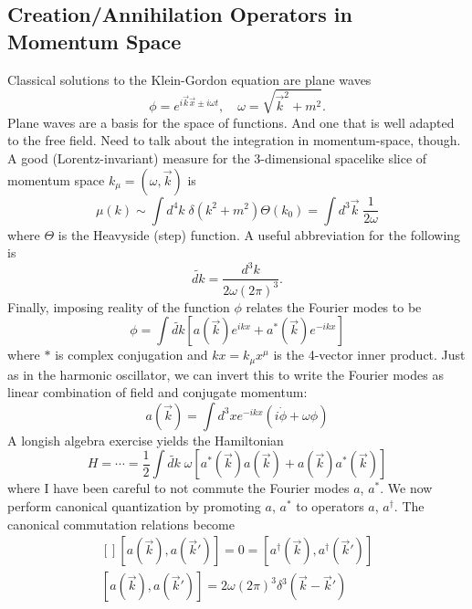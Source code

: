 \documentclass[12pt]{article}
\begin{document}
\subsection{Creation/Annihilation Operators in Momentum Space}

Classical solutions to the Klein-Gordon equation are plane waves
\begin{equation}
  \phi = e^{i\vec{k}\vec{x} \pm i\omega t}
  ,\quad
  \omega = \sqrt{\vec{k}^2 + m^2}.
\end{equation}
Plane waves are a basis for the space of functions. And one that is
well adapted to the free field. Need to talk about the integration in
momentum-space, though. A good (Lorentz-invariant) measure for the
3-dimensional spacelike slice of momentum space $k_\mu=(\omega, \vec{k})$
is
\begin{equation}
  \mu(k) \sim \int d^4k\; \delta(k^2+m^2) \Theta(k_0)
  = \int d^3\vec{k} \; \frac{1}{2\omega}
\end{equation}
where $\Theta$ is the Heavyside (step) function. A useful abbreviation
for the following is 
\begin{equation}
  \widetilde{dk} = \frac{d^3k}{2\omega (2\pi)^3}.
\end{equation}
Finally, imposing reality of the function $\phi$ relates the Fourier
modes to be
\begin{equation}
  \phi = \int \widetilde{dk} 
  \left[
    a(\vec{k}) e^{ikx} + a^\ast(\vec{k}) e^{-ikx} 
  \right]
\end{equation}
where $\ast$ is complex conjugation and $kx = k_\mu x^\mu$ is the
4-vector inner product. Just as in the harmonic oscillator, we can
invert this to write the Fourier modes as linear combination of field
and conjugate momentum:
\begin{equation}
  \label{eq:a(phi)}
  a(\vec{k}) = \int d^3x e^{-ikx} (i\dot \phi + \omega \phi)
\end{equation}
A longish algebra exercise yields the Hamiltonian
\begin{equation}
  H = \cdots = \frac{1}{2} \int \widetilde{dk}\; \omega
  \left[
    a^\ast(\vec{k}) a(\vec{k}) + 
    a(\vec{k}) a^\ast(\vec{k}) 
  \right]
\end{equation}
where I have been careful to not commute the Fourier modes $a$,
$a^\ast$. We now perform canonical quantization by promoting $a$,
$a^\ast$ to operators $a$, $a^\dagger$. The canonical commutation
relations become
\begin{equation}
  \begin{gathered}[]
    [a(\vec{k}), a(\vec{k}')] = 0 =
    [a^\dagger(\vec{k}), a^\dagger(\vec{k}')]
    \\
    [a(\vec{k}), a(\vec{k}')] = 
    2 \omega (2\pi)^3 \delta^3(\vec{k}-\vec{k}')
  \end{gathered}
\end{equation}
\end{document}

